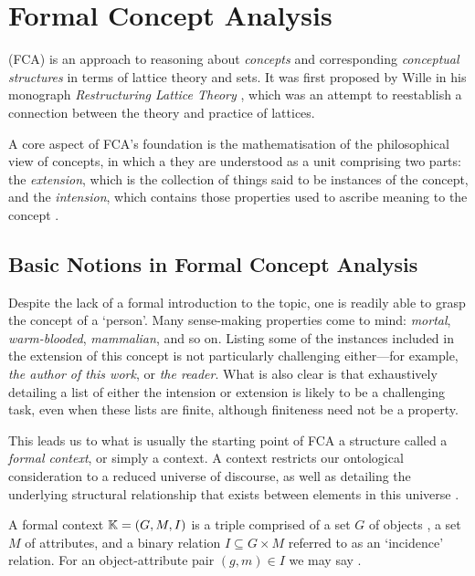 \chapter{Formal Concept Analysis}
\label{chapter:formal-concept-analysis}


\FCA (FCA) \cite{Wille_Restructuring,WILLE1992493,ganter1999formal} is an
approach to reasoning about \textit{concepts} and corresponding \textit{conceptual
	structures} in terms of lattice theory and sets. It was first proposed by Wille in
his monograph \textit{Restructuring Lattice Theory} \cite{Wille_Restructuring}, which
was an attempt to reestablish a connection between the theory and practice of lattices.

A core aspect of FCA’s foundation is the mathematisation of the philosophical view
of concepts, in which a they are understood as a unit comprising two parts: the \textit{extension},
which is the collection of things said to be instances of the concept, and the
\textit{intension}, which contains those properties used to ascribe meaning to
the concept \cite{DUQUENNE1999407}.

\section{Basic Notions in Formal Concept Analysis}
\label{section:basic-notions}

Despite the lack of a formal introduction to the topic, one is readily
able to grasp the concept of a `person'. Many sense-making properties
come to mind: \textit{mortal}, \textit{warm-blooded}, \textit{mammalian}, and so
on. Listing some of the instances included in the extension of this concept is
not particularly challenging either---for example, \textit{the author of this
	work}, or \textit{the reader}. What is also clear is that exhaustively detailing
a list of either the intension or extension is likely to be a challenging task,
even when these lists are finite, although finiteness need not be a property.

This leads us to what is usually the starting point of FCA a structure called a
\textit{formal context}, or simply a context. A context restricts our ontological
consideration to a reduced universe of discourse, as well as detailing the
underlying structural relationship that exists between elements in this universe
\cite{Wille_Restructuring,Dau2005}.

\begin{definition}
	 \label{definition:formal-context} A formal context $\mathbb{K}
		= (G,M,\mathrel{I})$ is a triple comprised of a set $G$ of objects , a set $M$ of attributes,
	and a binary relation $I \subseteq G \times M$ referred to as an `incidence'
	relation. For an object-attribute pair $(g,m) \in I$ we may say .
\end{definition}

